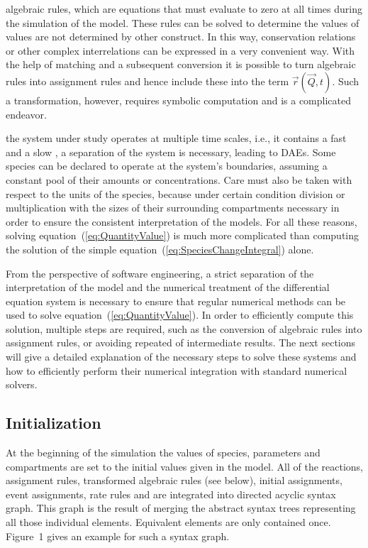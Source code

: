 \documentclass[10pt]{bmc_article}
\newenvironment{bmcformat}{\begin{raggedright}\baselineskip20pt\sloppy\setboolean{publ}{false}}{\end{raggedright}\baselineskip20pt\sloppy}
\begin{document}
\begin{bmcformat}
 algebraic rules, which are equations that
must evaluate to zero at all times during the simulation of the model.
These rules can be solved to determine the values of  values
are not determined by  other construct.
In this way, conservation relations or other complex interrelations can be
expressed in a very convenient way.
With the help of  matching \cite{hopcroft1973n} and a subsequent
conversion it is possible to turn algebraic rules into assignment rules and
hence include these into the term $\vec{r}(\vec{Q}, t)$.
Such a transformation, however, requires symbolic computation and is
 a complicated endeavor.

 the system under study operates at multiple time
scales, i.e., it contains a fast and a slow , a separation of the
system is necessary, leading to \acfp{DAE}.
Some species can be declared to operate at the system's boundaries, assuming a
constant pool of their amounts or concentrations.
Care must also be taken with respect to the units of the species, because under
certain condition division or multiplication with the sizes of their surrounding
compartments  necessary in order to ensure the consistent interpretation of
the models. 
For all these reasons, solving equation~(\ref{eq:QuantityValue}) is much more 
complicated than computing the solution of the simple equation~(\ref{eq:SpeciesChangeIntegral})
alone.

From the perspective of software engineering, a strict separation of the 
interpretation of the model and the numerical treatment of the differential
equation system is necessary to ensure that regular numerical methods can be used
to solve equation~(\ref{eq:QuantityValue}).
In order to efficiently compute this solution, multiple  steps are
required, such as the conversion of algebraic rules into assignment rules, or
avoiding repeated  of intermediate results.
The next sections will give a detailed explanation of the necessary steps to
solve these systems and how to efficiently perform their numerical integration
with standard numerical solvers.


\subsection*{Initialization}

At the beginning of the simulation the values of species, parameters and
compartments are set to the initial values given in the model.
All  of the reactions, assignment rules, transformed algebraic
rules (see below), initial assignments, event assignments, rate rules and
 are integrated into  directed
acyclic syntax graph.
This graph is 
the result of merging the abstract syntax trees representing
all those individual elements.
Equivalent elements are only contained once.
Figure~1 gives an example for such a syntax graph.


\end{bmcformat}
\end{document}
